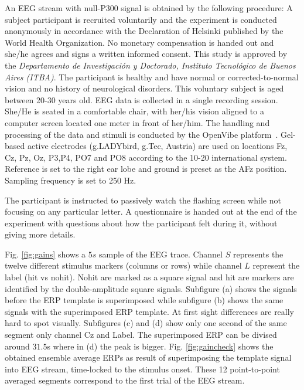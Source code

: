 \documentclass[brainsci,article,submit,moreauthors,pdftex,10pt,a4paper]{mdpi}
\begin{document}
An EEG stream with null-P300 signal is obtained by the following procedure: 
A subject participant is recruited voluntarily and the experiment is conducted anonymously in accordance with the Declaration of Helsinki published by the World Health Organization.  No monetary compensation is handed out and she/he agrees and signs a written informed consent.  This study is approved by the \textit{Departamento de Investigación y Doctorado, Instituto Tecnológico de Buenos Aires (ITBA)}.  The participant is healthy and have normal or corrected-to-normal vision and no history of neurological disorders. This voluntary subject is aged between 20-30 years old.  EEG data is collected in a single recording session. She/He is seated in a comfortable chair, with her/his vision aligned to a computer screen located one meter in front of her/him.  The handling and processing of the data and stimuli is conducted by the OpenVibe platform~\citep{Renard2010}.  Gel-based active electrodes (g.LADYbird, g.Tec, Austria) are used on locations Fz, Cz, Pz, Oz, P3,P4, PO7 and PO8 according to the 10-20 international system.  Reference is set to the right ear lobe and ground is preset as the AFz position.   Sampling frequency is set to 250 Hz.

The participant is instructed to passively watch the flashing screen while not focusing on any particular letter.  A questionnaire is handed out at the end of the experiment with questions about how the participant felt during it, without giving more details.  


Fig. \ref{fig:gains} shows a $5s$ sample of the EEG trace.  Channel $S$ represents the twelve different stimulus markers (columns or rows) while channel $L$ represent the label (hit vs nohit).  Nohit are marked as a square signal and hit are markers are identified by the double-amplitude square signals.  Subfigure (a) shows the signals before the ERP template is superimposed while subfigure (b) shows the same signals with the superimposed ERP template.  At first sight differences are really hard to spot visually.  Subfigures (c) and (d) show only one second of the same segment only channel Cz and Label.  The superimposed ERP can be divised around $31.5$s where in (d) the peak is bigger.  Fig. \ref{fig:gaincheck} shows the obtained ensemble average ERPs as result of superimposing the template signal into EEG stream, time-locked to the stimulus onset.   These 12 point-to-point averaged segments correspond to the first trial of the EEG stream.
\end{document}
